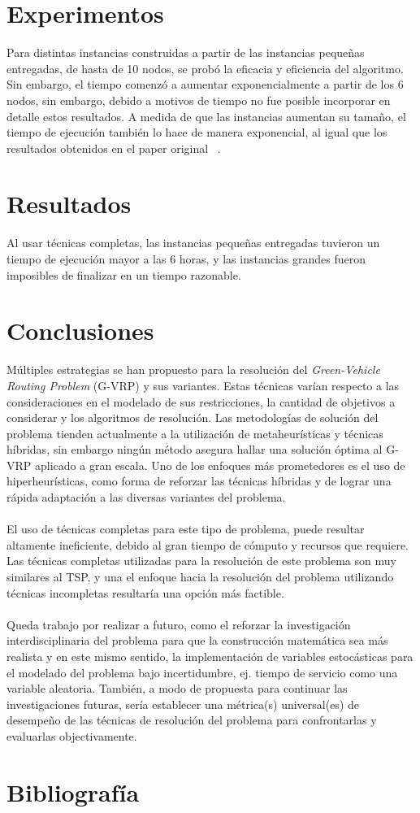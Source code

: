\documentclass[letter, 10pt]{article}
\begin{document}
\section{Experimentos}
Para distintas instancias construidas a partir de las instancias pequeñas entregadas, de hasta de 10 nodos, se probó la eficacia y eficiencia del algoritmo. Sin embargo, el tiempo comenzó a aumentar exponencialmente a partir de los 6 nodos, sin embargo, debido a motivos de tiempo no fue posible incorporar en detalle estos resultados. A medida de que las instancias aumentan su tamaño, el tiempo de ejecución también lo hace de manera exponencial, al igual que los resultados obtenidos en el paper original ~\cite{erdogan_green_2012}.
\section{Resultados}
Al usar técnicas completas, las instancias pequeñas entregadas tuvieron un tiempo de ejecución mayor a las 6 horas, y las instancias grandes fueron imposibles de finalizar en un tiempo razonable.
\section{Conclusiones}
Múltiples estrategias se han propuesto para la resolución del \textit{Green-Vehicle Routing Problem} (G-VRP) y sus variantes.
Estas técnicas varían respecto a las consideraciones en el modelado de sus restricciones, la cantidad de objetivos a considerar y los algoritmos de resolución. 
Las metodologías de solución del problema tienden actualmente a la utilización de metaheurísticas y técnicas híbridas, sin embargo ningún método asegura hallar una solución óptima al G-VRP aplicado a gran escala. Uno de los enfoques más prometedores es el uso de hiperheurísticas, como forma de reforzar las técnicas híbridas y de lograr una rápida adaptación a las diversas variantes del problema.
\\
\\El uso de técnicas completas para este tipo de problema, puede resultar altamente ineficiente, debido al gran tiempo de cómputo y recursos que requiere. Las técnicas completas utilizadas para la resolución de este problema son muy similares al TSP, y una el enfoque hacia la resolución del problema utilizando técnicas incompletas resultaría una opción más factible.
\\
\\Queda trabajo por realizar a futuro, como el reforzar la investigación interdisciplinaria del problema para que la construcción matemática sea más realista y en este mismo sentido, la implementación de variables estocásticas para el modelado del problema bajo incertidumbre, ej. tiempo de servicio como una variable aleatoria. También, a modo de propuesta para continuar las investigaciones futuras, sería establecer una métrica(s) universal(es) de desempeño de las técnicas de resolución del problema para confrontarlas y evaluarlas objectivamente. 

\newpage
\section{Bibliograf\'ia}



\end{document}
